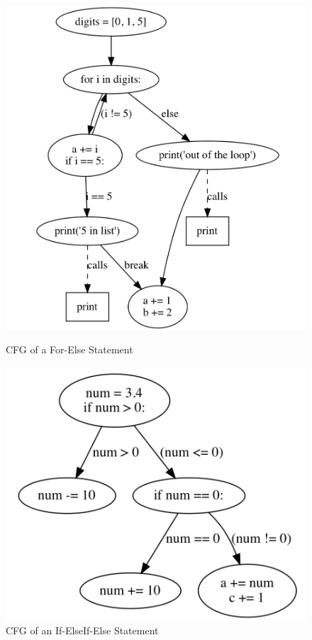 \documentclass[11pt]{article}
\begin{document}
\begin{figure}[H]
\centering
\begin{minipage}{.48\linewidth}
    \includegraphics[width=\linewidth]{forElse}
    \caption{CFG of a For-Else Statement}
    \label{forelse}
\end{minipage}
\hfill
\begin{minipage}{.48\linewidth}
    \includegraphics[width=\linewidth]{if}
    \caption{CFG of an If-ElseIf-Else Statement}
    \label{if}
\end{minipage}
\end{figure}
\end{document}
